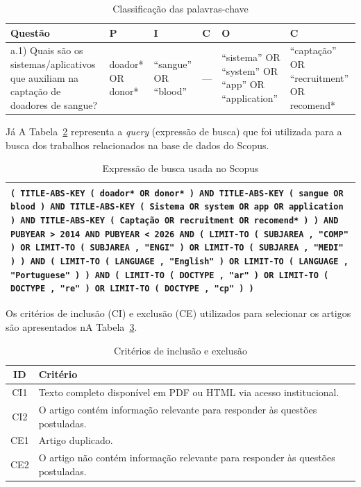 \begin{table}[H]
  \centering
  \caption{Classificação das palavras-chave}
  \label{tab:pico}
  \begin{tabularx}{\textwidth}{>{\raggedright\arraybackslash}p{3.2cm} X X X X X}
    \toprule
    \textbf{Questão} & \textbf{P} & \textbf{I} & \textbf{C} & \textbf{O} & \textbf{C} \\
    \midrule
    a.1) Quais são os sistemas/aplicativos que auxiliam na captação de doadores de sangue?
    & doador* OR donor*
    & ``sangue'' OR ``blood''
    & ---
    & ``sistema'' OR ``system'' OR ``app'' OR ``application''
    & ``captação'' OR ``recruitment'' OR recomend* \\
    \bottomrule
  \end{tabularx}
\end{table}

Já A Tabela~\ref{tab:query} representa a \textit{query} (expressão de busca) que foi utilizada para a busca dos trabalhos relacionados na base de dados do Scopus.

\begin{table}[H]
  \centering
  \caption{Expressão de busca usada no Scopus}
  \label{tab:query}
  \begin{tabularx}{\textwidth}{X}
    \toprule
    \texttt{( TITLE-ABS-KEY ( doador* OR donor* ) AND TITLE-ABS-KEY ( sangue OR blood ) AND TITLE-ABS-KEY ( Sistema OR system OR app OR application ) AND TITLE-ABS-KEY ( Captação OR recruitment OR recomend* ) ) AND PUBYEAR > 2014 AND PUBYEAR < 2026 AND ( LIMIT-TO ( SUBJAREA , "COMP" ) OR LIMIT-TO ( SUBJAREA , "ENGI" ) OR LIMIT-TO ( SUBJAREA , "MEDI" ) ) AND ( LIMIT-TO ( LANGUAGE , "English" ) OR LIMIT-TO ( LANGUAGE , "Portuguese" ) ) AND ( LIMIT-TO ( DOCTYPE , "ar" ) OR LIMIT-TO ( DOCTYPE , "re" ) OR LIMIT-TO ( DOCTYPE , "cp" ) )} \\
    \bottomrule
  \end{tabularx}
\end{table}

Os critérios de inclusão (CI) e exclusão (CE) utilizados para selecionar os artigos são apresentados nA Tabela~\ref{tab:criterios}.

\begin{table}[H]
  \centering
  \caption{Critérios de inclusão e exclusão}
  \label{tab:criterios}
  \begin{tabularx}{\textwidth}{c X}
    \toprule
    \textbf{ID} & \textbf{Critério} \\
    \midrule
    CI1 & Texto completo disponível em PDF ou HTML via acesso institucional. \\
    CI2 & O artigo contém informação relevante para responder às questões postuladas. \\
    CE1 & Artigo duplicado. \\
    CE2 & O artigo não contém informação relevante para responder às questões postuladas. \\
    \bottomrule
  \end{tabularx}
\end{table}

